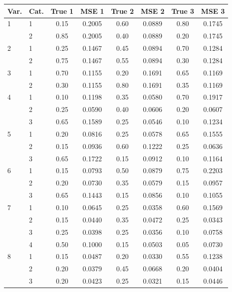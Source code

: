 \begin{table}[H]
\centering
\begin{tabular}{llcccccc}
  \toprule
\textbf{Var.} & \textbf{Cat.} & \textbf{True 1} & \textbf{MSE 1} & \textbf{True 2} & \textbf{MSE 2} & \textbf{True 3} & \textbf{MSE 3} \\ 
  \midrule
1 & 1 & 0.15 & 0.2005 & 0.60 & 0.0889 & 0.80 & 0.1745 \\ 
   & 2 & 0.85 & 0.2005 & 0.40 & 0.0889 & 0.20 & 0.1745 \\ 
  2 & 1 & 0.25 & 0.1467 & 0.45 & 0.0894 & 0.70 & 0.1284 \\ 
   & 2 & 0.75 & 0.1467 & 0.55 & 0.0894 & 0.30 & 0.1284 \\ 
  3 & 1 & 0.70 & 0.1155 & 0.20 & 0.1691 & 0.65 & 0.1169 \\ 
   & 2 & 0.30 & 0.1155 & 0.80 & 0.1691 & 0.35 & 0.1169 \\ 
  4 & 1 & 0.10 & 0.1198 & 0.35 & 0.0580 & 0.70 & 0.1917 \\ 
   & 2 & 0.25 & 0.0590 & 0.40 & 0.0606 & 0.20 & 0.0607 \\ 
   & 3 & 0.65 & 0.1589 & 0.25 & 0.0546 & 0.10 & 0.1234 \\ 
  5 & 1 & 0.20 & 0.0816 & 0.25 & 0.0578 & 0.65 & 0.1555 \\ 
   & 2 & 0.15 & 0.0936 & 0.60 & 0.1222 & 0.25 & 0.0636 \\ 
   & 3 & 0.65 & 0.1722 & 0.15 & 0.0912 & 0.10 & 0.1164 \\ 
  6 & 1 & 0.15 & 0.0793 & 0.50 & 0.0879 & 0.75 & 0.2203 \\ 
   & 2 & 0.20 & 0.0730 & 0.35 & 0.0579 & 0.15 & 0.0957 \\ 
   & 3 & 0.65 & 0.1443 & 0.15 & 0.0856 & 0.10 & 0.1055 \\ 
  7 & 1 & 0.10 & 0.0645 & 0.25 & 0.0358 & 0.60 & 0.1569 \\ 
   & 2 & 0.15 & 0.0440 & 0.35 & 0.0472 & 0.25 & 0.0343 \\ 
   & 3 & 0.25 & 0.0398 & 0.25 & 0.0356 & 0.10 & 0.0758 \\ 
   & 4 & 0.50 & 0.1000 & 0.15 & 0.0503 & 0.05 & 0.0730 \\ 
  8 & 1 & 0.15 & 0.0487 & 0.20 & 0.0330 & 0.55 & 0.1238 \\ 
   & 2 & 0.20 & 0.0379 & 0.45 & 0.0668 & 0.20 & 0.0404 \\ 
   & 3 & 0.20 & 0.0423 & 0.25 & 0.0321 & 0.15 & 0.0446 \\ 

\end{tabular}
\end{table}
